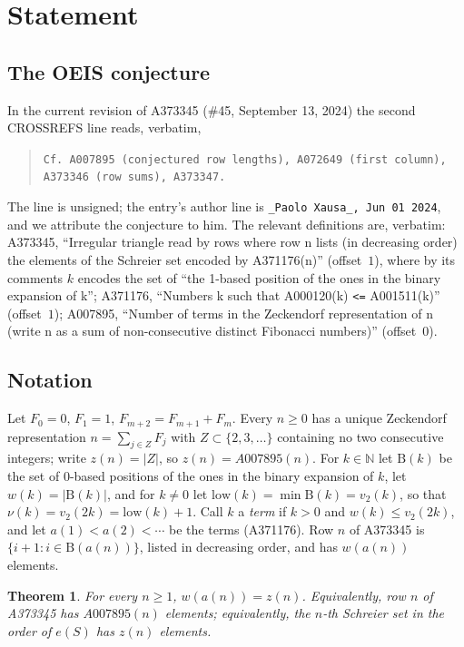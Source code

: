 \documentclass[11pt]{amsart}
\theoremstyle{plain}
\newtheorem{theorem}{Theorem}
\theoremstyle{definition}
\newcommand{\N}{\mathbb{N}}
\newcommand{\Bits}{\mathrm{B}}
\newcommand{\low}{\mathrm{low}}
\begin{document}
\section{Statement}\label{sec:statement}

\subsection*{The OEIS conjecture}
In the current revision of A373345 (\#45, September 13, 2024) the second CROSSREFS line reads, verbatim,
\begin{quote}\small
\texttt{Cf. A007895 (conjectured row lengths), A072649 (first column), A373346 (row sums), A373347.}
\end{quote}
The line is unsigned; the entry's author line is \texttt{\_Paolo Xausa\_, Jun 01 2024}, and we attribute the conjecture to him. The relevant definitions are, verbatim:
A373345, ``Irregular triangle read by rows where row n lists (in decreasing order) the elements of the Schreier set encoded by A371176(n)'' (offset~$1$), where by its comments $k$ encodes the set of ``the 1-based position of the ones in the binary expansion of k'';
A371176, ``Numbers k such that A000120(k) \texttt{<=} A001511(k)'' (offset~$1$);
A007895, ``Number of terms in the Zeckendorf representation of n (write n as a sum of non-consecutive distinct Fibonacci numbers)'' (offset~$0$).

\subsection*{Notation}
Let $F_0=0$, $F_1=1$, $F_{m+2}=F_{m+1}+F_m$. Every $n\ge0$ has a unique Zeckendorf representation $n=\sum_{j\in Z}F_j$ with $Z\subset\{2,3,\dots\}$ containing no two consecutive integers; write $z(n)=|Z|$, so $z(n)=A007895(n)$.
For $k\in\N$ let $\Bits(k)$ be the set of $0$-based positions of the ones in the binary expansion of $k$, let $w(k)=|\Bits(k)|$, and for $k\ne0$ let $\low(k)=\min\Bits(k)=v_2(k)$, so that $\nu(k)=v_2(2k)=\low(k)+1$.
Call $k$ a \emph{term} if $k>0$ and $w(k)\le v_2(2k)$, and let $a(1)<a(2)<\cdots$ be the terms (A371176). Row $n$ of A373345 is $\{i+1:i\in\Bits(a(n))\}$, listed in decreasing order, and has $w(a(n))$ elements.

\begin{theorem}\label{thm:main}
For every $n\ge1$, $w(a(n))=z(n)$. Equivalently, row $n$ of A373345 has $A007895(n)$ elements; equivalently, the $n$-th Schreier set in the order of $e(S)$ has $z(n)$ elements.
\end{theorem}
\end{document}
